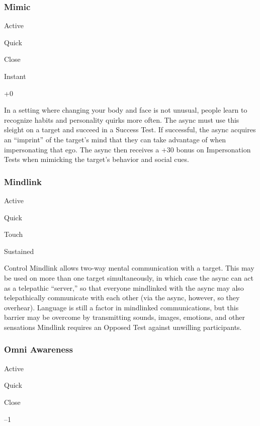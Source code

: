 \subsubsection{Mimic}


  

Active

   Quick

 Close

   Instant

   +0

  
In a setting where changing your body and face is 
not unusual, people learn to recognize habits and 
personality quirks more often. The async must use 
this sleight on a target and succeed in a Success Test. 
If successful, the async acquires an ``imprint'' of the 
target's mind that they can take advantage of when 
impersonating that ego. The async then receives a +30 
bonus on Impersonation Tests when mimicking the 
target's behavior and social cues.

\subsubsection{Mindlink}


  

Active

   Quick

 Touch

   Sustained

  

Control
Mindlink allows two-way mental communication 
with a target. This may be used on more than one 
target simultaneously, in which case the async can act 
as a telepathic ``server,'' so that everyone mindlinked 
with the async may also telepathically communicate 
with each other (via the async, however, so they 
overhear). Language is still a factor in mindlinked 
communications, but this barrier may be overcome by 
transmitting sounds, images, emotions, and other sensations
Mindlink requires an Opposed Test against
unwilling participants.

\subsubsection{Omni Awareness}


  

Active

   Quick

 Close

  

   –1

